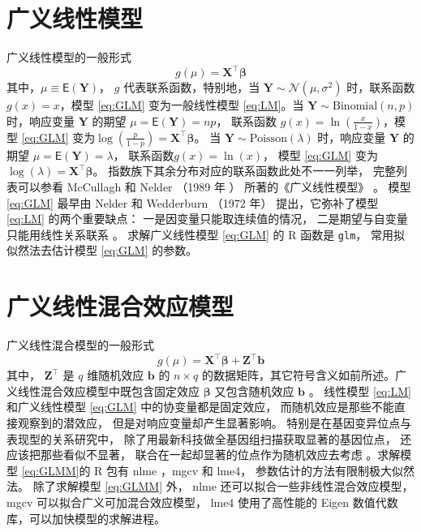 \documentclass[12pt,a4paper,UTF8,twoside]{book}
\theoremstyle{definition}
\theoremstyle{definition}
\theoremstyle{definition}
\theoremstyle{remark}
\begin{document}
\hypertarget{sec:Generalized-Linear-Models}{%
\section{广义线性模型}\label{sec:Generalized-Linear-Models}}

广义线性模型的一般形式
\begin{equation}
g(\mu) = \mathbf{X}^{\top}\boldsymbol{\beta}  \label{eq:GLM}
\end{equation}
\noindent 其中，\(\mu \equiv \mathsf{E}(\mathbf{Y})\)， \(g\) 代表联系函数，特别地，当 \(\mathbf{Y} \sim \mathcal{N}(\mu,\sigma^2)\) 时，联系函数 \(g(x) = x\)，模型 \eqref{eq:GLM} 变为一般线性模型 \eqref{eq:LM}。当 \(\mathbf{Y} \sim \mathrm{Binomial}(n,p)\) 时，响应变量 \(\mathbf{Y}\) 的期望 \(\mu =\mathsf{E}(\mathbf{Y}) = np\)， 联系函数 \(g(x)=\ln(\frac{x}{1-x})\)，模型 \eqref{eq:GLM} 变为\(\log(\frac{p}{1-p})=\mathbf{X}^{\top}\boldsymbol{\beta}\)。 当 \(\mathbf{Y} \sim \mathrm{Poisson}(\lambda)\) 时，响应变量 \(\mathbf{Y}\) 的期望 \(\mu =\mathsf{E}(\mathbf{Y}) = \lambda\)， 联系函数\(g(x) = \ln(x)\)， 模型 \eqref{eq:GLM} 变为 \(\log(\lambda) = \mathbf{X}^{\top}\boldsymbol{\beta}\)。 指数族下其余分布对应的联系函数此处不一一列举， 完整列表可以参看 McCullagh 和 Nelder （1989 年 ）\citep{McCullagh1989} 所著的《广义线性模型》 。 模型 \eqref{eq:GLM} 最早由 Nelder 和 Wedderburn （1972 年）\citep{Nelder1972} 提出，它弥补了模型 \eqref{eq:LM} 的两个重要缺点： 一是因变量只能取连续值的情况， 二是期望与自变量只能用线性关系联系 \citep{Chen2011}。 求解广义线性模型 \eqref{eq:GLM} 的 R 函数是 \texttt{glm}， 常用拟似然法去估计模型 \eqref{eq:GLM} 的参数。

\hypertarget{sec:Generalized-Linear-Mixed-Effects-Models}{%
\section{广义线性混合效应模型}\label{sec:Generalized-Linear-Mixed-Effects-Models}}

广义线性混合模型的一般形式
\begin{equation}
g(\mu) = \mathbf{X}^{\top}\boldsymbol{\beta} + \mathbf{Z}^{\top}\mathbf{b}  \label{eq:GLMM}
\end{equation}
\noindent 其中， \(\mathbf{Z}^{\top}\) 是 \(q\) 维随机效应 \(\mathbf{b}\) 的 \(n \times q\) 的数据矩阵，其它符号含义如前所述。广义线性混合效应模型中既包含固定效应 \(\boldsymbol{\beta}\) 又包含随机效应 \(\mathbf{b}\) 。 线性模型 \eqref{eq:LM} 和广义线性模型 \eqref{eq:GLM} 中的协变量都是固定效应， 而随机效应是那些不能直接观察到的潜效应， 但是对响应变量却产生显著影响。 特别是在基因变异位点与表现型的关系研究中， 除了用最新科技做全基因组扫描获取显著的基因位点， 还应该把那些看似不显著， 联合在一起却显著的位点作为随机效应去考虑 \citep{Yang2010Common}。求解模型 \eqref{eq:GLMM}的 R 包有 nlme ，mgcv 和 lme4， 参数估计的方法有限制极大似然法。 除了求解模型 \eqref{eq:GLMM} 外， nlme 还可以拟合一些非线性混合效应模型， mgcv 可以拟合广义可加混合效应模型， lme4 使用了高性能的 Eigen 数值代数库，可以加快模型的求解进程。
\end{document}

